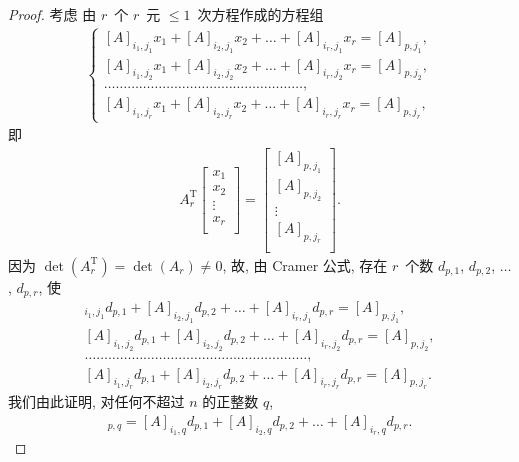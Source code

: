 \begin{proof}
    考虑%
    由 \(r\)~个 \(r\)~元 \({\leq} 1\)~次方程作成的方程组
    \begin{align*}
        \begin{cases}
            [A]_{i_1,j_1} x_1 + [A]_{i_2,j_1} x_2
            + \dots + [A]_{i_r,j_1} x_r = [A]_{p,j_1},
            \\
            [A]_{i_1,j_2} x_1 + [A]_{i_2,j_2} x_2
            + \dots + [A]_{i_r,j_2} x_r = [A]_{p,j_2},
            \\
            \dots
            \dots \dots \dots \dots
            \dots \dots \dots \dots
            \dots \dots \dots \dots
            \dots \dots \dots \dots,
            \\
            [A]_{i_1,j_r} x_1 + [A]_{i_2,j_r} x_2
            + \dots + [A]_{i_r,j_r} x_r = [A]_{p,j_r},
        \end{cases}
    \end{align*}
    即
    \begin{align*}
        A_r^{\mathrm{T}}
        \begin{bmatrix}
            x_1    \\
            x_2    \\
            \vdots \\
            x_r    \\
        \end{bmatrix}
        =
        \begin{bmatrix}
            [A]_{p,j_1} \\
            [A]_{p,j_2} \\
            \vdots      \\
            [A]_{p,j_r} \\
        \end{bmatrix}.
    \end{align*}
    因为
    \(\det {(A_r^{\mathrm{T}})}
    = \det {(A_r)} \neq 0\),
    故, 由 Cramer 公式,
    存在 \(r\)~个数
    \(d_{p,1}\), \(d_{p,2}\), \(\dots\), \(d_{p,r}\),
    使
    \begin{align*}
        [A]_{i_1,j_1} d_{p,1} + [A]_{i_2,j_1} d_{p,2}
        + \dots + [A]_{i_r,j_1} d_{p,r} = [A]_{p,j_1},
        \\
        [A]_{i_1,j_2} d_{p,1} + [A]_{i_2,j_2} d_{p,2}
        + \dots + [A]_{i_r,j_2} d_{p,r} = [A]_{p,j_2},
        \\
        \dots \dots \dots
        \dots \dots \dots \dots
        \dots \dots \dots \dots
        \dots \dots \dots \dots
        \dots \dots \dots \dots,
        \\
        [A]_{i_1,j_r} d_{p,1} + [A]_{i_2,j_r} d_{p,2}
        + \dots + [A]_{i_r,j_r} d_{p,r} = [A]_{p,j_r}.
    \end{align*}
    我们由此证明, 对任何不超过 \(n\) 的正整数 \(q\),
    \begin{align*}
        [A]_{p,q}
            =
            [A]_{i_1,q} d_{p,1}
        + [A]_{i_2,q} d_{p,2}
        + \dots
        + [A]_{i_r,q} d_{p,r}.
    \end{align*}


\end{proof}
